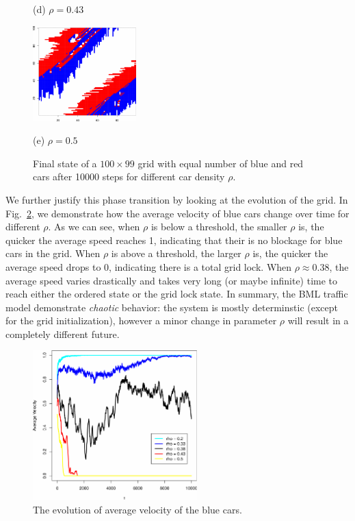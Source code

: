 \documentclass[twocolumn]{article}
\begin{document}
\begin{figure}[!t]
\begin{minipage}[b]{0.49\linewidth}
      \centerline{(d) $\rho = 0.43$}\medskip
    \end{minipage}
    \hfill
    \begin{minipage}[b]{1\linewidth}
      \centering
      \centerline{\includegraphics[width=4.0cm]{./figs/TestBehavior_100_99_10000_05_end}}
      \centerline{(e) $\rho = 0.5$}\medskip
    \end{minipage}
    \caption{Final state of a $100\times99$ grid with equal number of blue and
    red cars after 10000 steps for different car density $\rho$.}
    \label{fig:final_state}
\end{figure}

We further justify this phase transition by looking at the evolution of the
grid. In Fig.~\ref{fig:average_velocity}, we demonstrate how the average
velocity of blue cars change over time for different $\rho$. As we can see, when
$\rho$ is below a threshold, the smaller $\rho$ is, the quicker the average
speed reaches 1, indicating that their is no blockage for blue cars in the grid.
When $\rho$ is above a threshold, the larger $\rho$ is, the quicker the average
speed drops to 0, indicating there is a total grid lock. When $\rho\approx
0.38$, the average speed varies drastically and takes very long (or maybe
infinite) time to reach either the ordered state or the grid lock state. In
summary, the BML traffic model demonstrate \emph{chaotic} behavior: the system
is mostly determinstic (except for the grid initialization), however a minor
change in parameter $\rho$ will result in a completely different future.

\begin{figure}[h]
    \centering
    \includegraphics[width=2.5in]{figs/TestVelocity.pdf}
    \caption{The evolution of average velocity of the blue cars.}
    \label{fig:average_velocity}
\end{figure}
\end{document}
